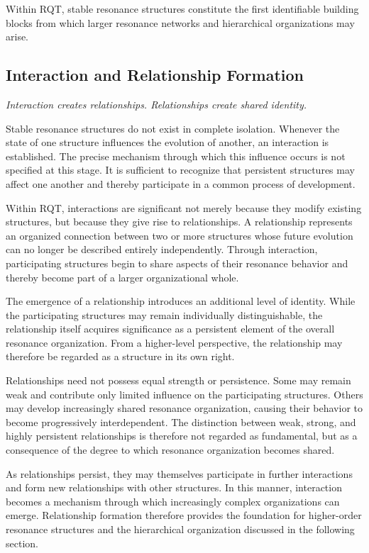 \documentclass[11pt,a4paper]{article}
\begin{document}
Within RQT, stable resonance structures constitute the first identifiable building blocks from which larger resonance networks and hierarchical organizations may arise.


\subsection{Interaction and Relationship Formation}

\emph{Interaction creates relationships. Relationships create shared identity.}

Stable resonance structures do not exist in complete isolation. Whenever the state of one structure influences the evolution of another, an interaction is established. The precise mechanism through which this influence occurs is not specified at this stage. It is sufficient to recognize that persistent structures may affect one another and thereby participate in a common process of development.

Within RQT, interactions are significant not merely because they modify existing structures, but because they give rise to relationships. A relationship represents an organized connection between two or more structures whose future evolution can no longer be described entirely independently. Through interaction, participating structures begin to share aspects of their resonance behavior and thereby become part of a larger organizational whole.

The emergence of a relationship introduces an additional level of identity. While the participating structures may remain individually distinguishable, the relationship itself acquires significance as a persistent element of the overall resonance organization. From a higher-level perspective, the relationship may therefore be regarded as a structure in its own right.

Relationships need not possess equal strength or persistence. Some may remain weak and contribute only limited influence on the participating structures. Others may develop increasingly shared resonance organization, causing their behavior to become progressively interdependent. The distinction between weak, strong, and highly persistent relationships is therefore not regarded as fundamental, but as a consequence of the degree to which resonance organization becomes shared.

As relationships persist, they may themselves participate in further interactions and form new relationships with other structures. In this manner, interaction becomes a mechanism through which increasingly complex organizations can emerge. Relationship formation therefore provides the foundation for higher-order resonance structures and the hierarchical organization discussed in the following section.
\end{document}
